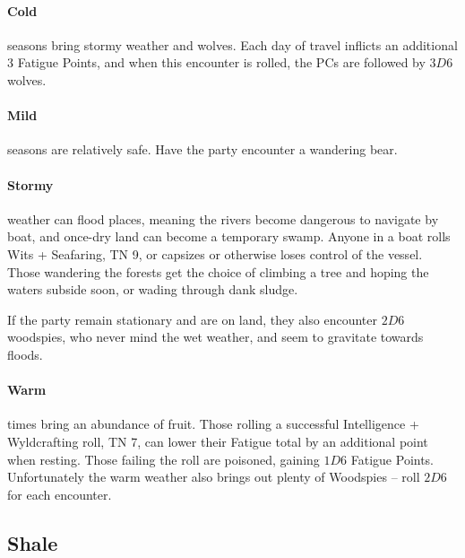 \begin{multicols}{2}
{\paragraph{Cold} seasons bring stormy weather and wolves.
Each day of travel inflicts an additional 3 Fatigue Points, and when this encounter is rolled, the PCs are followed by $3D6$ wolves.

\paragraph{Mild} seasons are relatively safe.
Have the party encounter a wandering bear.

\paragraph{Stormy} weather can flood places, meaning the rivers become dangerous to navigate by boat, and once-dry land can become a temporary swamp.
Anyone in a boat rolls Wits + Seafaring, TN 9, or capsizes or otherwise loses control of the vessel.
Those wandering the forests get the choice of climbing a tree and hoping the waters subside soon, or wading through dank sludge.

If the party remain stationary and are on land, they also encounter $2D6$ woodspies, who never mind the wet weather, and seem to gravitate towards floods.

\paragraph{Warm} times bring an abundance of fruit.
Those rolling a successful Intelligence + Wyldcrafting roll, TN 7, can lower their Fatigue total by an additional point when resting.
Those failing the roll are poisoned, gaining $1D6$ Fatigue Points.
Unfortunately the warm weather also brings out plenty of Woodspies -- roll $2D6$ for each encounter.

}

\subsection{Shale}


\iftoggle{players}{}{

  \begin{figure*}[t!]
  \begin{nametable}[c||L|L|L|L|L|L|L|L,fontupper=\footnotesize,]{Encounter in Shale}


\end{nametable}
\end{figure*}}
\end{multicols}

